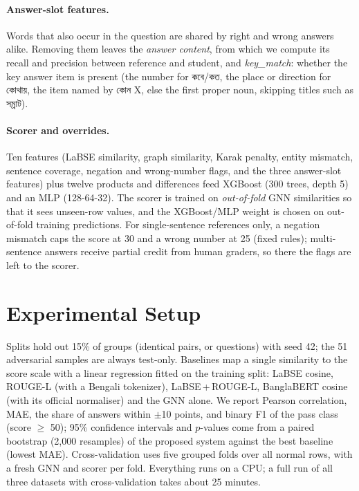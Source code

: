 \documentclass[10pt,a4paper,twocolumn]{article}
\newcommand{\bn}[1]{{\bengalifont #1}}
\begin{document}
\paragraph{Answer-slot features.}
Words that also occur in the question are shared by right and wrong answers
alike. Removing them leaves the \emph{answer content}, from which we compute
its recall and precision between reference and student, and
\emph{key\_match}: whether the key answer item is present (the number for
\bn{কবে}/\bn{কত}, the place or direction for \bn{কোথায়}, the item named by
\bn{কোন X}, else the first proper noun, skipping titles such as \bn{সম্রাট}).

\paragraph{Scorer and overrides.}
Ten features (LaBSE similarity, graph similarity, Karak penalty, entity
mismatch, sentence coverage, negation and wrong-number flags, and the three
answer-slot features) plus twelve products and differences feed XGBoost (300
trees, depth 5) and an MLP (128-64-32). The scorer is trained on
\emph{out-of-fold} GNN similarities so that it sees unseen-row values, and the
XGBoost/MLP weight is chosen on out-of-fold training predictions. For
single-sentence references only, a negation mismatch caps the score at 30
and a wrong number at 25 (fixed rules); multi-sentence answers receive partial
credit from human graders, so there the flags are left to the scorer.

\section{Experimental Setup}
Splits hold out 15\% of groups (identical pairs, or questions) with seed 42;
the 51 adversarial samples are always test-only. Baselines map a single
similarity to the score scale with a linear regression fitted on the training
split: LaBSE cosine, ROUGE-L (with a Bengali tokenizer), LaBSE\,+\,ROUGE-L,
BanglaBERT cosine (with its official normaliser) and the GNN alone. We report
Pearson correlation, MAE, the share of answers within $\pm$10 points, and
binary F1 of the pass class (score $\geq$ 50); 95\% confidence intervals and
$p$-values come from a paired bootstrap (2,000 resamples) of the proposed
system against the best baseline (lowest MAE). Cross-validation uses five
grouped folds over all normal rows, with a fresh GNN and scorer per fold.
Everything runs on a CPU; a full run of all three datasets with
cross-validation takes about 25 minutes.
\end{document}
